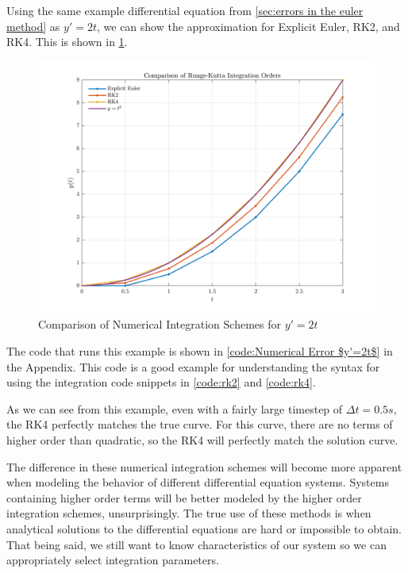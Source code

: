 \documentclass[12pt]{report}
\begin{document}
{Using the same example differential equation from \ref{sec:errors in the euler method} as $y'=2t$, we can show the approximation for Explicit Euler, RK2, and RK4. This is shown in \ref{fig:Numerical Comparison}.
\begin{figure}[ht]
    \centering
    \includegraphics[width=\linewidth]{6DoF Explanation Scripts/Numerical Integrator Comparison Figure.png}
    \caption{Comparison of Numerical Integration Schemes for $y'=2t$}
    \label{fig:Numerical Comparison}
\end{figure}
The code that runs this example is shown in \ref{code:Numerical Error $y'=2t$} in the Appendix. This code is a good example for understanding the syntax for using the integration code snippets in \ref{code:rk2} and \ref{code:rk4}.

As we can see from this example, even with a fairly large timestep of $\Delta t=0.5s$, the RK4 perfectly matches the true curve. For this curve, there are no terms of higher order than quadratic, so the RK4 will perfectly match the solution curve.

The difference in these numerical integration schemes will become more apparent when modeling the behavior of different differential equation systems. Systems containing higher order terms will be better modeled by the higher order integration schemes, unsurprisingly. The true use of these methods is when analytical solutions to the differential equations are hard or impossible to obtain. That being said, we still want to know characteristics of our system so we can appropriately select integration parameters.

}
\end{document}
